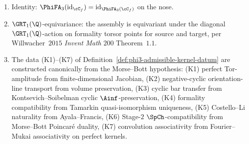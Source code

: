 \begin{theorem}
\begin{enumerate}[label=\textup{(\roman*)}]
 Theorem~$4.1$). The cyclic-BV layer is subsumed by CY-
 preservation of $F$, $G$.
 \item Identity: $\PhiFA_3(\mathrm{id}_{\cC_f}) = \mathrm{id}_{\PhiFA_3(\cC_f)}$
 on the nose.
 \item $\GRT_1(\Q)$-equivariance: the assembly is equivariant under
 the diagonal $\GRT_1(\Q)$-action on formality torsor points
 for source and target, per Willwacher~$2015$ \textit{Invent Math}
 $200$ Theorem~$1.1$.
 \item The data \textup{(K1)}--\textup{(K7)} of
 Definition~\ref{def:phi3-admissible-kernel-datum} are
 constructed canonically from the Morse--Bott hypothesis:
 \textup{(K1)} perfect Tor-amplitude from finite-dimensional
 Jacobian, \textup{(K2)} negative-cyclic orientation-line
 transport from volume preservation, \textup{(K3)} cyclic bar
 transfer from Kontsevich--Soibelman cyclic $\Ainf$-preservation,
 \textup{(K4)} formality compatibility from Tamarkin
 quasi-isomorphism uniqueness, \textup{(K5)} Costello--Li
 naturality from Ayala--Francis, \textup{(K6)} Stage-$2$
 $\SpCh$-compatibility from Morse--Bott Poincar\'e duality,
 \textup{(K7)} convolution associativity from Fourier--Mukai
 associativity on perfect kernels.
\end{enumerate}
\end{theorem}

